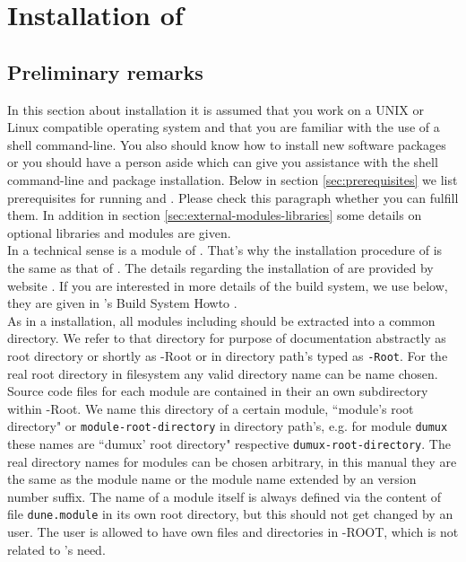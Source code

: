 \section{Installation of \Dumux} \label{install}
\subsection{Preliminary remarks}

In this section about installation it is assumed that you work on a UNIX or Linux compatible operating system
and that you are familiar with the use of a shell command-line.  You also should know how to install new software packages
or you should have a person aside which can give you assistance with the shell command-line and package installation. 
Below in section \ref{sec:prerequisites} we list prerequisites for running \Dune and \Dumux. 
Please check this paragraph whether you can fulfill them.
In addition in section \ref{sec:external-modules-libraries} some details on optional libraries and modules are given. \\

In a technical sense \Dumux is a module of \Dune. 
That's why the installation procedure of \Dumux is the same as that of \Dune. 
The details regarding the installation of \Dune are provided by {\Dune} website \cite{DUNE-INST}. 
If you are interested in more details of the build system, we use below,
they are given in {\Dune}'s Build System Howto \cite{DUNE-BS}.\\


As in a \Dune installation, all \Dune modules including \Dumux should be extracted into a common directory. We refer to that directory for purpose of documentation abstractly as {\Dune} root directory or shortly as {\Dune}-Root or in directory path's typed as \texttt{\Dune-Root}. For the real {\Dune} root directory in filesystem any valid directory name can be name chosen.\\

Source code files for each \Dune module are contained in their an own subdirectory within {\Dune}-Root.
We name this directory of a certain module, ``module's root directory" or \texttt{module-root-directory} in directory path's,
e.g. for module \texttt{dumux} these names are  ``dumux' root directory" respective \texttt{dumux-root-directory}.
The real directory names for modules can be chosen arbitrary, in this manual they are the same as the
module name or the module name extended by an version number suffix.
The name of a \Dune module itself is always defined via the content of file \texttt{dune.module} in its own root
directory, but this should not get changed by an user. The user is allowed to have own files and directories in \Dune-ROOT, which is not related to \Dune's need.


